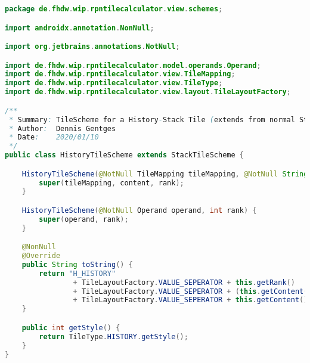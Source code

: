 \begin{lstlisting}[caption=HistoryTileScheme,label=list:HistoryTileScheme,language=Java]
package de.fhdw.wip.rpntilecalculator.view.schemes;

import androidx.annotation.NonNull;

import org.jetbrains.annotations.NotNull;

import de.fhdw.wip.rpntilecalculator.model.operands.Operand;
import de.fhdw.wip.rpntilecalculator.view.TileMapping;
import de.fhdw.wip.rpntilecalculator.view.TileType;
import de.fhdw.wip.rpntilecalculator.view.layout.TileLayoutFactory;

/**
 * Summary: TileScheme for a History-Stack Tile (extends from normal Stack-TileScheme)
 * Author:  Dennis Gentges
 * Date:    2020/01/10
 */
public class HistoryTileScheme extends StackTileScheme {

    HistoryTileScheme(@NotNull TileMapping tileMapping, @NotNull String content, int rank) {
        super(tileMapping, content, rank);
    }

    HistoryTileScheme(@NotNull Operand operand, int rank) {
        super(operand, rank);
    }

    @NonNull
    @Override
    public String toString() {
        return "H_HISTORY"
                + TileLayoutFactory.VALUE_SEPERATOR + this.getRank()
                + TileLayoutFactory.VALUE_SEPERATOR + (this.getContent() == " " ? "O_Empty" : this.getTileType())
                + TileLayoutFactory.VALUE_SEPERATOR + this.getContent();
    }

    public int getStyle() {
        return TileType.HISTORY.getStyle();
    }
}
\end{lstlisting}    

